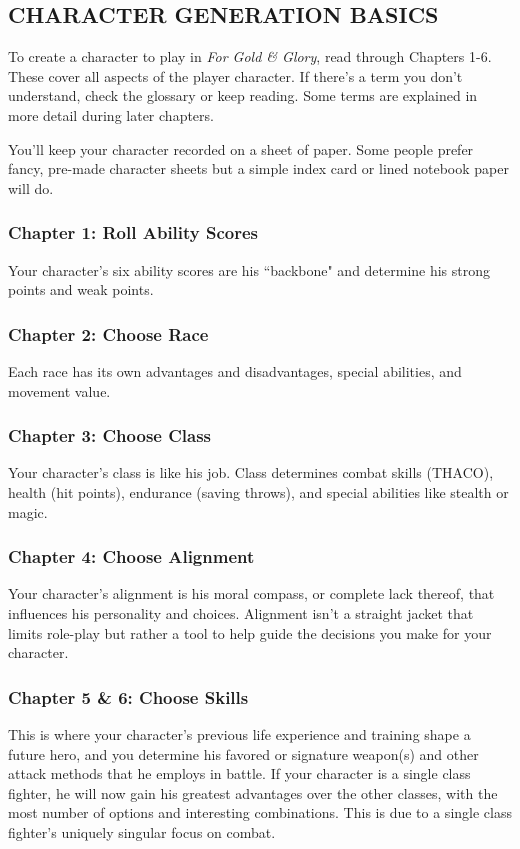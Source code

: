\begin{multicols}{2}
\section{CHARACTER GENERATION BASICS}

To create a character to play in \textit{For Gold \& Glory}\texttrademark{}, read through Chapters 1-6.  These cover all aspects of the player character.  If there's a term you don't understand, check the glossary or keep reading.  Some terms are explained in more detail during later chapters.

You'll keep your character recorded on a sheet of paper.  Some people prefer fancy, pre-made character sheets but a simple index card or lined notebook paper will do.

\subsubsection*{Chapter 1: Roll Ability Scores}
Your character's six ability scores are his ``backbone" and determine his strong points and weak points.

\subsubsection*{Chapter 2: Choose Race}
Each race has its own advantages and disadvantages, special abilities, and movement value.

\subsubsection*{Chapter 3: Choose Class}
Your character's class is like his job.  Class determines combat skills (THACO), health (hit points), endurance (saving throws), and special abilities like stealth or magic.

\subsubsection*{Chapter 4: Choose Alignment}
Your character's alignment is his moral compass, or complete lack thereof, that influences his personality and choices.  Alignment isn't a straight jacket that limits role-play but rather a tool to help guide the decisions you make for your character.  

\subsubsection*{Chapter 5 \& 6: Choose Skills}
This is where your character's previous life experience and training shape a future hero, and you determine his favored or signature weapon(s) and other attack methods that he employs in battle.  If your character is a single class fighter, he will now gain his greatest advantages over the other classes, with the most number of options and interesting combinations.  This is due to a single class fighter's uniquely singular focus on combat.


\end{multicols}
